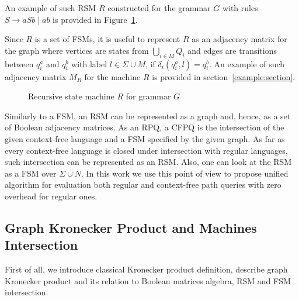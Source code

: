 An example of such RSM $R$ constructed for the grammar $G$ with rules $S \to a S b \mid a b$ is provided in Figure~\ref{example:automata}.


Since $R$ is a set of FSMs, it is useful to represent $R$ as an adjacency matrix for the graph where vertices are states from $\bigcup_{i \in M}Q_i$ and edges are transitions between $q_i^a$ and $q_i^b$ with label $l \in \Sigma \cup M$, if $\delta_i (q_i^a, l) = q_i^b$.
An example of such adjacency matrix $M_R$ for the machine $R$ is provided in section~\ref{example:section}.

\begin{figure}[h]
    \centering
    \caption{Recursive state machine $R$ for grammar $G$}
    \label{example:automata}
\end{figure}

Similarly to a FSM, an RSM can be represented as a graph and, hence, as a set of Boolean adjacency matrices.
As an RPQ, a CFPQ is the intersection of the given context-free language and a FSM specified by the given graph.
As far as every context-free language is closed under intersection with regular languages, such intersection can be represented as an RSM.
Also, one can look at the RSM as a FSM over $\Sigma \cup N$.
In this work we use this point of view to propose unified algorithm for evaluation both regular and context-free path queries with zero overhead for regular ones.

\subsection{Graph Kronecker Product and Machines Intersection}

First of all, we introduce classical Kronecker product definition,
describe graph Kronecker product and its relation to Boolean matrices algebra,
RSM and FSM intersection.

